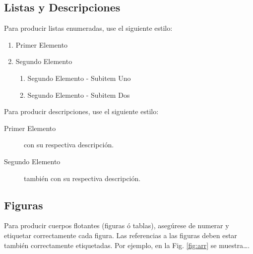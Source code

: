\documentclass[a4paper,10pt]{article}
\begin{document}
	
	





	\subsection{Listas y Descripciones}\label{sub:lists}
		Para producir listas enumeradas, use el siguiente estilo:

		\begin{enumerate}
			\item Primer Elemento
			\item Segundo Elemento
			\begin {enumerate}
				\item {Segundo Elemento - Subitem Uno}
				\item {Segundo Elemento - Subitem Dos}
			\end {enumerate}
		\end{enumerate}

		Para producir descripciones, use el siguiente estilo:

		\begin{description}
			\item [Primer Elemento] con su respectiva descripción.
			\item [Segundo Elemento] también con su respectiva descripción.
		\end{description}

	\subsection{Figuras}\label{sub:figures}
	

		Para producir cuerpos flotantes (figuras ó tablas), asegúrese de numerar
		y etiquetar correctamente cada figura. Las referencias a las figuras deben
		estar también correctamente etiquetadas. Por ejemplo, en la Fig. \ref{fig:arr}
		se muestra\ldots.
\end{document}
